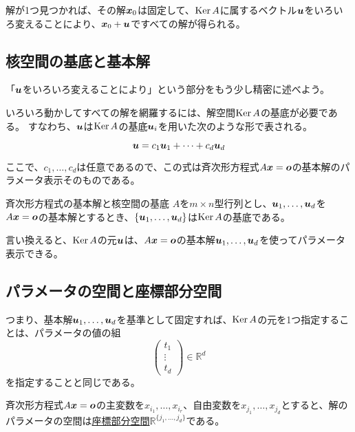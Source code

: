 \documentclass[../../../topic_linear-algebra]{subfiles}
\begin{document}
\br

解が1つ見つかれば、その解$\vb*{x}_0$は固定して、$\operatorname{Ker} A$に属するベクトル$\vb*{u}$をいろいろ変えることにより、$\vb*{x}_0 + \vb*{u}$ですべての解が得られる。

\subsection{核空間の基底と基本解}

「$\vb*{u}$をいろいろ変えることにより」という部分をもう少し精密に述べよう。

いろいろ動かしてすべての解を網羅するには、解空間$\operatorname{Ker} A$の基底が必要である。
すなわち、$\vb*{u}$は$\operatorname{Ker} A$の基底$\vb*{u}_i$を用いた次のような形で表される。

\begin{equation*}
  \vb*{u} = c_1 \vb*{u}_1 + \cdots + c_d \vb*{u}_d
\end{equation*}

ここで、$c_1, \ldots, c_d$は任意であるので、この式は斉次形方程式$A\vb*{x} = \vb*{o}$の基本解のパラメータ表示そのものである。

\begin{theorem*}{斉次形方程式の基本解と核空間の基底}
  $A$を$m \times n$型行列とし、$\vb*{u}_1, \dots, \vb*{u}_d$を$A\vb*{x} = \vb*{o}$の基本解とするとき、$\{ \vb*{u}_1, \dots, \vb*{u}_d \}$は$\operatorname{Ker} A$の基底である。
\end{theorem*}

言い換えると、$\operatorname{Ker} A$の元$\vb*{u}$は、$A\vb*{x} = \vb*{o}$の基本解$\vb*{u}_1,\dots,\vb*{u}_d$を使ってパラメータ表示できる。

\subsection{パラメータの空間と座標部分空間}

つまり、基本解$\vb*{u}_1, \dots, \vb*{u}_d$を基準として固定すれば、$\operatorname{Ker} A$の元を1つ指定することは、パラメータの値の組
\begin{equation*}
  \begin{pmatrix}
    t_1    \\
    \vdots \\
    t_d
  \end{pmatrix} \in \mathbb{R}^d
\end{equation*}
を指定することと同じである。

\br

斉次形方程式$A\vb*{x} = \vb*{o}$の主変数を$x_{i_1}, \dots, x_{i_r}$、自由変数を$x_{j_1}, \dots, x_{j_d}$とすると、解のパラメータの空間は\hyperref[def:coordinate-subspace]{座標部分空間}$\mathbb{R}^{\{ j_1, \dots, j_d \}}$である。
\end{document}
